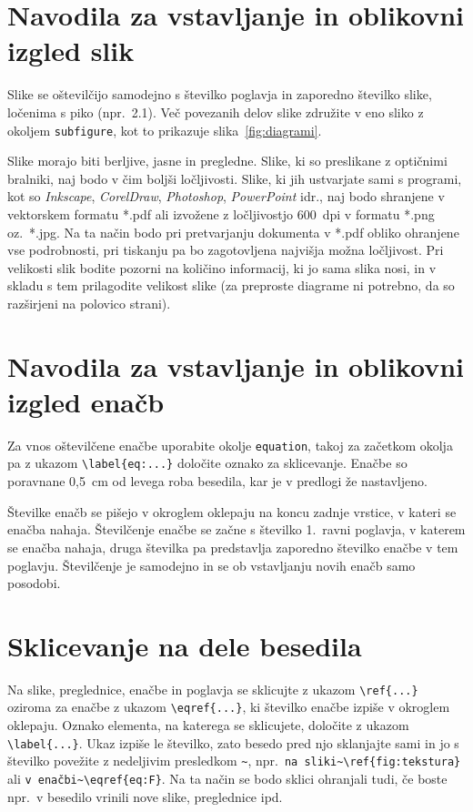\section*{Navodila za vstavljanje in oblikovni izgled slik}
Slike se oštevilčijo samodejno s številko poglavja in zaporedno številko slike, ločenima s piko (npr.~2.1). Več povezanih delov slike združite v eno sliko z okoljem \verb|subfigure|, kot to prikazuje slika~\ref{fig:diagrami}. 

Slike morajo biti berljive, jasne in pregledne. Slike, ki so preslikane z optičnimi bralniki, naj bodo v čim boljši ločljivosti. Slike, ki jih ustvarjate sami s programi, kot so \emph{Inkscape}, \emph{CorelDraw}, \emph{Photoshop}, \emph{PowerPoint} idr., naj bodo shranjene v vektorskem formatu *.pdf ali izvožene z ločljivostjo 600~dpi v formatu *.png oz.~*.jpg. Na ta način bodo pri pretvarjanju dokumenta v *.pdf obliko ohranjene vse podrobnosti, pri tiskanju pa bo zagotovljena najvišja možna ločljivost. Pri velikosti slik bodite pozorni na količino informacij, ki jo sama slika nosi, in v skladu s tem prilagodite velikost slike (za preproste diagrame ni potrebno, da so razširjeni na polovico strani).

\section*{Navodila za vstavljanje in oblikovni izgled enačb}
Za vnos oštevilčene enačbe uporabite okolje \verb|equation|, takoj za začetkom okolja pa z ukazom \verb|\label{eq:...}| določite oznako za sklicevanje. Enačbe so poravnane 0,5~cm od levega roba besedila, kar je v predlogi že nastavljeno.

Številke enačb se pišejo v okroglem oklepaju na koncu zadnje vrstice, v kateri se enačba nahaja. Številčenje enačbe se začne s številko 1.~ravni poglavja, v katerem se enačba nahaja, druga številka pa predstavlja zaporedno številko enačbe v tem poglavju. Številčenje je samodejno in se ob vstavljanju novih enačb samo posodobi.

\section*{Sklicevanje na dele besedila}
Na slike, preglednice, enačbe in poglavja se sklicujte z ukazom \verb|\ref{...}| oziroma za enačbe z ukazom \verb|\eqref{...}|, ki številko enačbe izpiše v okroglem oklepaju. Oznako elementa, na katerega se sklicujete, določite z ukazom \verb|\label{...}|. Ukaz izpiše le številko, zato besedo pred njo sklanjajte sami in jo s številko povežite z nedeljivim presledkom \verb|~|, npr.~\verb|na sliki~\ref{fig:tekstura}| ali \verb|v enačbi~\eqref{eq:F}|. Na ta način se bodo sklici ohranjali tudi, če boste npr.~v besedilo vrinili nove slike, preglednice ipd.

